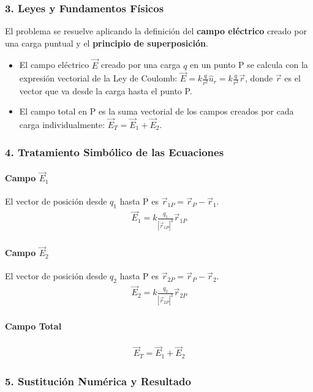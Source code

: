 \subsubsection*{3. Leyes y Fundamentos Físicos}
El problema se resuelve aplicando la definición del \textbf{campo eléctrico} creado por una carga puntual y el \textbf{principio de superposición}.
\begin{itemize}
    \item El campo eléctrico $\vec{E}$ creado por una carga $q$ en un punto P se calcula con la expresión vectorial de la Ley de Coulomb: $\vec{E} = k \frac{q}{r^2} \hat{u}_r = k \frac{q}{r^3} \vec{r}$, donde $\vec{r}$ es el vector que va desde la carga hasta el punto P.
    \item El campo total en P es la suma vectorial de los campos creados por cada carga individualmente: $\vec{E}_T = \vec{E}_1 + \vec{E}_2$.
\end{itemize}

\subsubsection*{4. Tratamiento Simbólico de las Ecuaciones}
\paragraph*{Campo $\vec{E}_1$}
El vector de posición desde $q_1$ hasta P es $\vec{r}_{1P} = \vec{r}_P - \vec{r}_1$.
\begin{gather}
    \vec{E}_1 = k \frac{q_1}{|\vec{r}_{1P}|^3} \vec{r}_{1P}
\end{gather}
\paragraph*{Campo $\vec{E}_2$}
El vector de posición desde $q_2$ hasta P es $\vec{r}_{2P} = \vec{r}_P - \vec{r}_2$.
\begin{gather}
    \vec{E}_2 = k \frac{q_2}{|\vec{r}_{2P}|^3} \vec{r}_{2P}
\end{gather}
\paragraph*{Campo Total}
\begin{gather}
    \vec{E}_T = \vec{E}_1 + \vec{E}_2
\end{gather}

\subsubsection*{5. Sustitución Numérica y Resultado}
